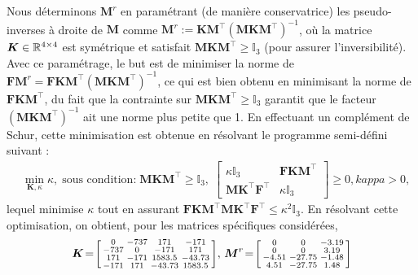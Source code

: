 Nous déterminons $\boldsymbol{M}^r$ en paramétrant (de manière conservatrice) les  pseudo-inverses à droite de $\boldsymbol{M}$ comme $\boldsymbol{M}^r := \boldsymbol{K}\boldsymbol{M}^\top ( \boldsymbol{M}\boldsymbol{K}\boldsymbol{M}^\top)^{-1}$, où la matrice $\boldsymbol{K} \in {\mathbb R}^{4\times 4}$ est symétrique et satisfait $\boldsymbol{M}\boldsymbol{K}\boldsymbol{M}^\top \geq \mathbb{I}_3$ (pour assurer l'inversibilité). Avec ce paramétrage, le but est de minimiser la norme de $\boldsymbol{F}\boldsymbol{M}^r = \boldsymbol{F} \boldsymbol{K}\boldsymbol{M}^\top ( \boldsymbol{M}\boldsymbol{K}\boldsymbol{M}^\top)^{-1}$, ce qui est bien obtenu en minimisant la norme de $\boldsymbol{F} \boldsymbol{K}\boldsymbol{M}^\top$, du fait que la contrainte sur $\boldsymbol{M}\boldsymbol{K}\boldsymbol{M}^\top \geq \mathbb{I}_3$ garantit que le facteur $( \boldsymbol{M}\boldsymbol{K}\boldsymbol{M}^\top)^{-1}$ ait une norme plus petite que 1.
En effectuant un complément de Schur, cette minimisation est obtenue en résolvant le programme semi-défini suivant :
\begin{align*}
&  \min_{\boldsymbol{K}, \kappa} \kappa, \; \mbox{sous condition:}
\;  \boldsymbol{M} \boldsymbol{K} \boldsymbol{M}^\top\! \geq \!\mathbb{I}_3, \; 
  \begin{bmatrix}
  \kappa \mathbb{I}_3  &\! \boldsymbol{F} \boldsymbol{K} \boldsymbol{M}^\top \\ 
  \boldsymbol{M} \boldsymbol{K}^\top \boldsymbol{F}^\top &\! \kappa \mathbb{I}_3
  \end{bmatrix}\! \geq\! 0, kappa > 0, 
\end{align*}
lequel minimise $\kappa$ tout en assurant $\boldsymbol{F} \boldsymbol{K} \boldsymbol{M}^\top \boldsymbol{M} \boldsymbol{K}^\top \boldsymbol{F}^\top \leq \kappa^2 \mathbb{I}_3$.  En résolvant cette optimisation, on obtient, pour les matrices spécifiques considérées,
\begin{align*}
    \boldsymbol{K} \!=\! \left[ \begin{smallmatrix}  0   &   -737   &    171   &   -171\\
      -737  &  0   &  -171  &     171\\
       171  &    -171    &   1583.5    &   -43.73\\
      -171  &     171    &   -43.73    &   1583.5 \end{smallmatrix} \right]\!, \,
      \boldsymbol{M}^r \!=\! \left[ \begin{smallmatrix}0     &          0   &   -3.19\\
                 0      &         0   &    3.19\\
               -4.51    &  -27.75    &   -1.48\\
                4.51    &  -27.75    &    1.48 \end{smallmatrix} \right]
\end{align*}

